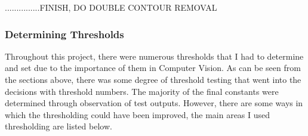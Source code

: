 \documentclass[11pt]{article}
\begin{document}
...............FINISH, DO DOUBLE CONTOUR REMOVAL

\subsubsection{Determining Thresholds}
Throughout this project, there were numerous thresholds that I had to 
determine and set due to the importance of them in Computer Vision. 
As can be seen from the sections above, there was some degree of 
threshold testing that went into the decisions with threshold numbers.
The majority of the final constants were determined through observation
of test outputs. However, there are some ways in which the thresholding
could have been improved, the main areas I used thresholding are listed below.\\
\end{document}
